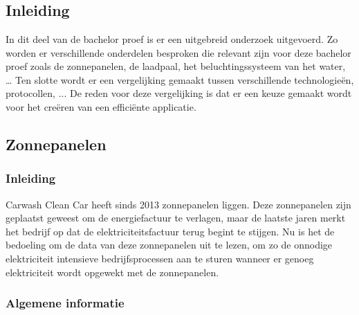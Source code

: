 \chapter{}%
\label{ch:stand-van-zaken}



\section{Inleiding}
\label{sec:stand-van-zaken-inleiding}

In dit deel van de bachelor proef is er een uitgebreid onderzoek uitgevoerd. Zo worden er verschillende onderdelen besproken die relevant zijn voor deze bachelor proef zoals de zonnepanelen, de laadpaal, het beluchtingssysteem van het water, … Ten slotte wordt er een vergelijking gemaakt tussen verschillende technologieën, protocollen, ... De reden voor deze vergelijking is dat er een keuze gemaakt wordt voor het creëren van een efficiënte applicatie.

\section{Zonnepanelen}
\label{sec:stand-van-zaken-zonnepanelen}

\subsection{Inleiding}
\label{sec:stand-van-zaken-zonnepanelen-inleiding}

Carwash Clean Car heeft sinds 2013 zonnepanelen liggen. Deze zonnepanelen zijn geplaatst geweest om de energiefactuur te verlagen, maar de laatste jaren merkt het bedrijf op dat de elektriciteitsfactuur terug begint te stijgen. Nu is het de bedoeling om de data van deze zonnepanelen uit te lezen, om zo de onnodige elektriciteit intensieve bedrijfsprocessen aan te sturen wanneer er genoeg elektriciteit wordt opgewekt met de zonnepanelen.

\subsection{Algemene informatie}
\label{sec:stand-van-zaken-zonnepanelen-algemene-informatie}

